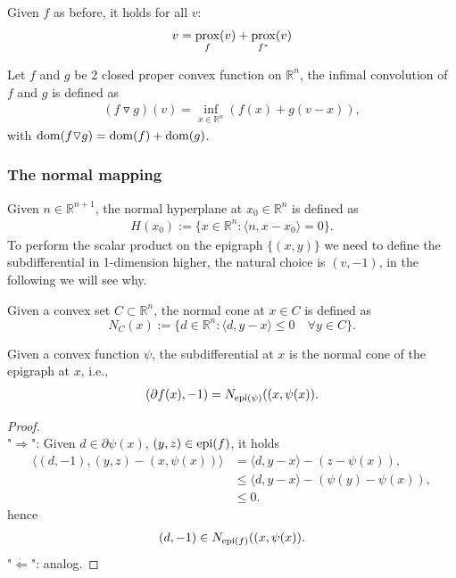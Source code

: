 \begin{theorem}
	Given $f$ as before, it holds for all $v$:
	\begin{align*}
		v = \operatorname*{prox}_f(v) + \operatorname*{prox}_{f^*}(v)
	\end{align*}
\end{theorem}

\begin{definition}
	Let $f$ and $g$ be 2 closed proper convex function on $\mathbb{R}^n$, the infimal convolution of $f$ and $g$ is defined as 
	\begin{align*}
		(f \triangledown g)(v) = \inf_{x \in \mathbb{R}^n}( f(x) + g(v - x)),
	\end{align*}
	with $\operatorname{dom}(f \triangledown g) = \operatorname{dom}(f) + \operatorname{dom}(g)$. 
\end{definition}


\subsubsection{The normal mapping}
Given $n \in \mathbb{R}^{n + 1}$, the normal hyperplane at $x_0 \in \mathbb{R}^n$ is defined as 
\begin{align*}
	H(x_0):= \{ x \in \mathbb{R}^n: \langle n, x - x_0 \rangle = 0\}.
\end{align*}
To perform the scalar product on the epigraph $\{(x, y)\}$ we need to define the subdifferential in 1-dimension higher, the natural choice is $(v, -1)$, in the following we will see why.

\begin{definition}
Given a convex set $C \subset \mathbb{R}^n$, the normal cone at $x \in C$ is defined as
	\begin{equation}
		N_C(x):= \{ d \in \mathbb{R}^n: \langle d, y - x\rangle \le 0 \quad \forall y 
		\in C \}. 
	\end{equation}
\end{definition}

\begin{lemma}
	Given a convex function $\psi$, the subdifferential at $x$ is the normal cone of the epigraph at $x$, i.e., 
	\begin{align*}
		(\partial f(x), -1) = N_{\operatorname*{epi}(\psi)}((x, \psi(x)).
	\end{align*}
\end{lemma}
\begin{proof}
	\quad\\
	"$\Rightarrow$": Given $d \in \partial \psi(x)$, $(y, z) \in \operatorname*{epi}(f)$, it holds 
\begin{align*}
	  \langle (d, -1), (y, z) - (x, \psi(x)) \rangle &= \langle d, y - x \rangle - (z - \psi(x)), \\
	  & \le \langle d, y - x\rangle - (\psi(y) - \psi(x)), \\
	  &  \le 0. 
\end{align*}
hence
\begin{align*}
	(d, -1) \in N_{\operatorname*{epi}(f)}((x, \psi(x)). 
\end{align*}
"$\Leftarrow$": analog.
\end{proof}


